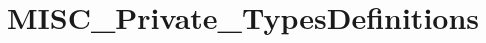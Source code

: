 \hypertarget{group___m_i_s_c___private___types_definitions}{}\section{M\+I\+S\+C\+\_\+\+Private\+\_\+\+Types\+Definitions}
\label{group___m_i_s_c___private___types_definitions}

